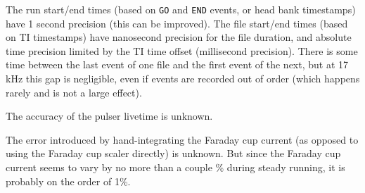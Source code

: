 \documentclass[aps,amsmath,amssymb,notitlepage,11pt,onecolumn]{revtex4-1}
\begin{document}
The run start/end times (based on \texttt{GO} and \texttt{END} events, or head bank timestamps) have 1 second precision (this can be improved).
The file start/end times (based on TI timestamps) have nanosecond precision for the file duration, and absolute time precision limited by the TI time offset (millisecond precision).
There is some time between the last event of one file and the first event of the next, but at 17 kHz this gap is negligible, even if events are recorded out of order (which happens rarely and is not a large effect).

The accuracy of the pulser livetime is unknown.

The error introduced by hand-integrating the Faraday cup current (as opposed to using the Faraday cup scaler directly) is unknown.
But since the Faraday cup current seems to vary by no more than a couple \% during steady running, it is probably on the order of 1\%.
\end{document}
